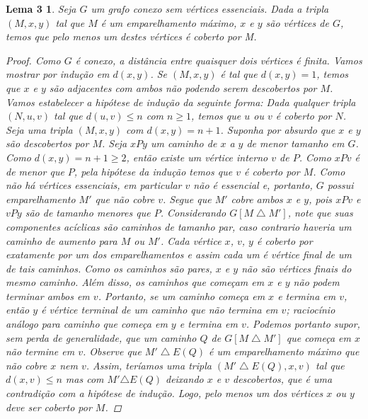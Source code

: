 \documentclass[a4paper,12pt]{article}
\newtheorem*{3}{Lema 3}
\begin{document}
\begin{3}

Seja $G$ um grafo conexo sem vértices essenciais. Dada a tripla $(M, x, y)$ tal que $M$ é um emparelhamento máximo, $x$ e $y$ são vértices de $G$, temos que pelo menos um destes vértices é coberto por M.

\begin{proof}

Como $G$ é conexo, a distância entre quaisquer dois vértices é finita. Vamos mostrar por indução em $d(x,y)$. Se $(M,x,y)$ é tal que $d(x, y) = 1$, temos que $x$ e $y$ são adjacentes com ambos não podendo serem descobertos por $M$. Vamos estabelecer a hipótese de indução da seguinte forma: Dada qualquer tripla $(N, u, v)$ tal que $d(u, v) \leq n$ com $n\geq1$, temos que $u$ ou $v$ é coberto por $N$. Seja uma tripla $(M, x, y)$ com $d(x, y) = n + 1$. Suponha por absurdo que $x$ e $y$ são descobertos por $M$. Seja $xPy$ um caminho de $x$ a $y$ de menor tamanho em $G$. Como $d(x,y)=n+1\geq2$, então existe um vértice interno $v$ de $P$. Como $xPv$ é de menor que $P$, pela hipótese da indução temos que $v$ é coberto por $M$. Como não há vértices essenciais, em particular $v$ não é essencial e, portanto,  $G$ possui emparelhamento $M'$ que não cobre $v$. Segue que $M'$ cobre ambos $x$ e $y$, pois $xPv$ e $vPy$ são de tamanho menores que $P$. Considerando $G[M \bigtriangleup M']$, note que suas componentes acíclicas são caminhos de tamanho par, caso contrario haveria um caminho de aumento para $M$ ou $M'$. Cada vértice $x$, $v$, $y$ é coberto por exatamente por um dos emparelhamentos e assim cada um é vértice final de um de tais caminhos. Como os caminhos são pares, $x$ e $y$ não são vértices finais do mesmo caminho. Além disso, os caminhos que começam em $x$ e $y$ não podem terminar ambos em $v$. Portanto, se um caminho começa em $x$ e termina em $v$, então $y$ é vértice terminal de um caminho que não termina em $v$; raciocínio análogo para caminho que começa em $y$ e termina em $v$. Podemos portanto supor, sem perda de generalidade, que um caminho $Q$ de $G[M \bigtriangleup M']$ que começa em $x$ não termine em $v$. Observe que $M' \bigtriangleup E(Q)$ é um emparelhamento máximo que não cobre $x$ nem $v$. Assim, teríamos uma tripla $(M' \bigtriangleup E(Q), x, v)$ tal que $d(x,v)\leq n$ mas com $M'\triangle E(Q)$ deixando $x$ e $v$ descobertos, que é uma contradição com a hipótese de indução. Logo, pelo menos um dos vértices $x$ ou $y$ deve ser coberto por $M$.


\end{proof}

\end{3}
\end{document}
